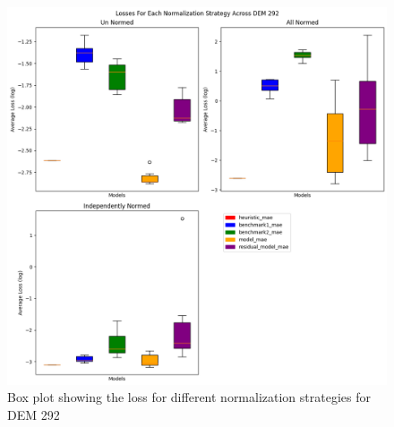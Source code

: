 \begin{figure}[tbph]
	\centering
	\includegraphics[width=0.9\linewidth, height=0.5\textheight]{"Figures/Results/Initial screening/Normalization plots/Box_Loss_Norm_strat"}
	\caption[Box plot for different normalization strategies]{Box plot showing the loss for different normalization strategies for DEM 292}
	\label{fig:norm-strat-292}
\end{figure}

